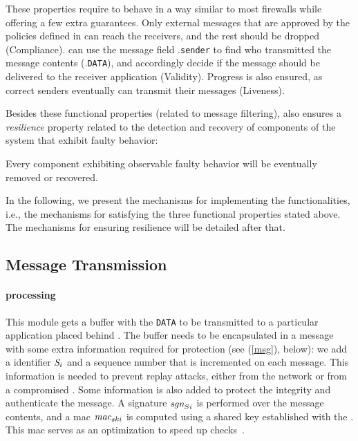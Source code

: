 These properties require \sieveq to behave in a way similar to most firewalls while offering a few extra guarantees. 
Only external messages that are approved by the policies defined in \sieveq can reach the receivers, and the rest should be dropped (Compliance). 
\Postsieve can use the message field \msg.\texttt{sender} to find who transmitted the message contents (\msg.\texttt{DATA}), and accordingly decide if the message should be delivered to the receiver application (Validity). 
Progress is also ensured, as correct senders eventually can transmit their messages (Liveness).

Besides these functional properties (related to message filtering), \sieveq also ensures a \emph{resilience} property related to the detection and recovery of components of the system that exhibit faulty behavior:


\begin{resilience}
Every component exhibiting observable faulty behavior will be eventually removed or recovered.
\end{resilience}

In the following, we present the mechanisms for implementing the \sieveq functionalities, i.e., the mechanisms for satisfying the three functional properties stated above.
The mechanisms for ensuring resilience will be detailed after that.

\subsection{Message Transmission}
\label{transmittingmessage}


\paragraph{\Sender processing}

This module gets a buffer with the \texttt{DATA} to be transmitted to a particular application placed behind \sieveq.
The buffer needs to be encapsulated in a message with some extra information required for protection (see (\ref{msg}), below): we add a \sender identifier $\emph{S}_i$ and a sequence number \sn that is incremented on each message.
This information is needed to prevent replay attacks, either from the network or from a compromised \presieve.
Some information is also added to protect the integrity and authenticate the message.
A signature $\emph{sgn}_{Si}$ is performed over the message contents, and a \gls{mac} $\emph{mac}_{ski}$ is computed using a shared key established with the \presieve.
This \gls{mac} serves as an optimization to speed up checks~\cite{Clement:2009}.

